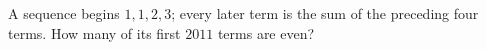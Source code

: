 A sequence begins $1,1,2,3$; every later term is the sum of the preceding four terms. How many of its first $2011$ terms are even?
